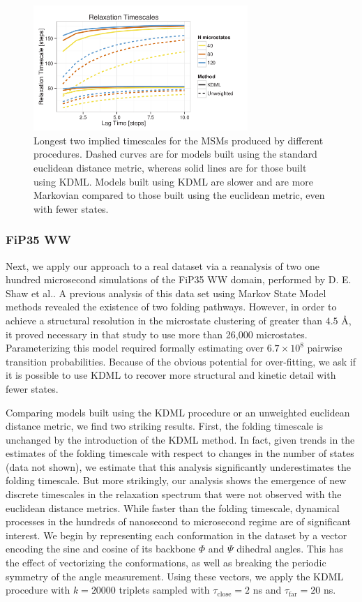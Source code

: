 \documentclass[twocolumn,floatfix,nofootinbib,aps]{revtex4-1}
\begin{document}
\begin{figure}
\centering
\includegraphics[width=3.2in]{../public/figures/timescales.png}
\caption{Longest two implied timescales for the MSMs produced by different procedures. Dashed curves are for models built using the standard euclidean distance metric, whereas solid lines are for those built using KDML. Models built using KDML are slower and are more Markovian compared to those built using the euclidean metric, even with fewer states.}
\end{figure}

\subsubsection{FiP35 WW}
Next, we apply our approach to a real dataset via a reanalysis of two one hundred microsecond simulations of the FiP35 WW domain, performed by D. E. Shaw et al.\cite{Shaw2010}. A previous analysis of this data set using Markov State Model methods revealed the existence of two folding pathways\cite{Lane:2011wj}. However, in order to  achieve a structural resolution in the microstate clustering of greater than $4.5$ \AA, it proved necessary in that study to use more than 26,000 microstates. Parameterizing this model required formally estimating over $6.7 \times 10^8$ pairwise transition probabilities. Because of the obvious potential for over-fitting, we ask if it is possible to use KDML to recover more structural and kinetic detail with fewer states.

Comparing models built using the KDML procedure or an unweighted euclidean distance metric, we find two striking results. First, the folding timescale is unchanged by the introduction of the KDML method. In fact, given trends in the estimates of the folding timescale with respect to changes in the number of states (data not shown), we estimate that this analysis significantly underestimates the folding timescale. But more strikingly, our analysis shows the emergence of new discrete timescales in the relaxation spectrum that were not observed with the euclidean distance metrics. While faster than the folding timescale, dynamical processes in the hundreds of nanosecond to microsecond regime are of significant interest. We begin by representing each conformation in the dataset by a vector encoding the sine and cosine of its backbone $\Phi$ and $\Psi$ dihedral angles. This has the effect of vectorizing the conformations, as well as breaking the periodic symmetry of the angle measurement. Using these vectors, we apply the KDML procedure with $k=20000$ triplets sampled with $\tau_\mathrm{close}= 2$ ns and $\tau_\mathrm{far}=20$ ns.
\end{document}
